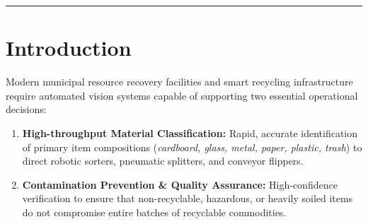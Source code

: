 \documentclass[11pt,a4paper]{article}
\begin{document}
\begin{abstract}
Crucially, probability calibration indicates that Platt-scaled SVM yields superior calibration (Expected Calibration Error, $\text{ECE} = 0.0590$) compared to modern deep networks ($\text{ECE} = 0.1038$). To bridge this gap for safety-critical deployment, we introduce an uncertainty-based abstention policy ($\tau = 0.60$): abstaining on ambiguous samples elevates retained test accuracy to \textbf{94.60\%} for MobileNetV2 and \textbf{89.27\%} for SVM. Finally, we integrate these models into an interactive diagnostic platform (\texttt{app.py}) featuring dual inference and an educational advisory establishing that visual material identification does not equal universal recyclability due to municipal infrastructure and organic food contamination.

\vspace{0.3cm}
\noindent\textbf{Keywords:} waste segregation, computer vision, hand-crafted descriptors, HOG, LBP, color histograms, transfer learning, MobileNetV2, confidence calibration, abstention policy, TrashNet.
\end{abstract}

\vspace{0.6cm}
\hrule
\vspace{0.4cm}

\tableofcontents

\newpage

\section{Introduction}
Modern municipal resource recovery facilities and smart recycling infrastructure require automated vision systems capable of supporting two essential operational decisions:
\begin{enumerate}[label=\arabic*.]
    \item \textbf{High-throughput Material Classification:} Rapid, accurate identification of primary item compositions (\textit{cardboard, glass, metal, paper, plastic, trash}) to direct robotic sorters, pneumatic splitters, and conveyor flippers.
    \item \textbf{Contamination Prevention \& Quality Assurance:} High-confidence verification to ensure that non-recyclable, hazardous, or heavily soiled items do not compromise entire batches of recyclable commodities.
\end{enumerate}
\end{document}
